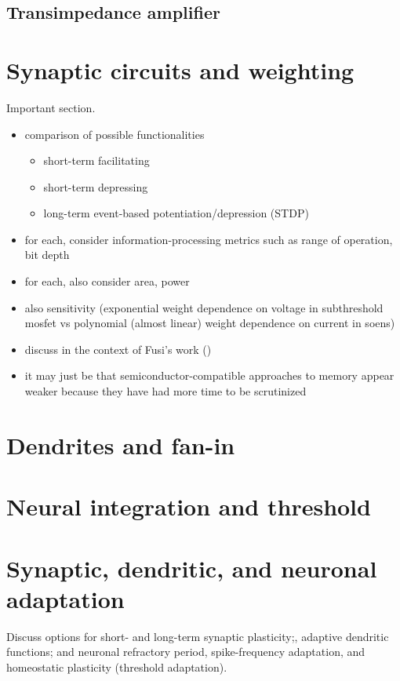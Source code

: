 \documentclass[twocolumn]{article}
\begin{document}
\subsection{Transimpedance amplifier}

\section{\label{sec:synapses}Synaptic circuits and weighting}
Important section.
\begin{itemize}
\item comparison of possible functionalities
\begin{itemize}
\item short-term facilitating
\item short-term depressing
\item long-term event-based potentiation/depression (STDP)
\end{itemize}
\item for each, consider information-processing metrics such as range of operation, bit depth 
\item for each, also consider area, power
\item also sensitivity (exponential weight dependence on voltage in subthreshold mosfet vs polynomial (almost linear) weight dependence on current in soens)
\item discuss in the context of Fusi's work (\cite{amfu1994,fudr2005,fuab2007})
\item it may just be that semiconductor-compatible approaches to memory appear weaker because they have had more time to be scrutinized
\end{itemize}

\section{\label{sec:dendrites}Dendrites and fan-in}

\section{\label{sec:neurons}Neural integration and threshold}

\section{\label{sec:adaptation}Synaptic, dendritic, and neuronal adaptation}
Discuss options for short- and long-term synaptic plasticity;, adaptive dendritic functions; and neuronal refractory period, spike-frequency adaptation, and homeostatic plasticity (threshold adaptation).
\end{document}
